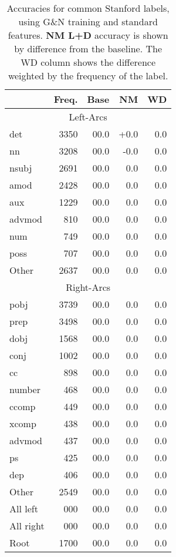 \documentclass[11pt,letterpaper]{article}
\begin{document}
\begin{table}
\centering
\small
\begin{tabular}{lrrrr}
        & Freq. & Base & NM & WD \\
    \hline \hline
    \multicolumn{5}{c}{Left-Arcs} \\
    \hline
    det	& 3350 & 00.0 & +0.0 & 0.0 \\
     nn	& 3208 & 00.0 &	-0.0 & 0.0 \\
  nsubj	& 2691 & 00.0 &	0.0 & 0.0 \\
   amod	& 2428 & 00.0 & 0.0 & 0.0 \\
aux	    & 1229 & 00.0 &	0.0 & 0.0 \\
advmod  & 810  & 00.0 & 0.0 & 0.0 \\
num	    & 749  & 00.0 & 0.0 & 0.0 \\
   poss	& 707  & 00.0 & 0.0 & 0.0 \\
  Other	& 2637 & 00.0 & 0.0 & 0.0 \\
\hline
\multicolumn{5}{c}{Right-Arcs} \\
\hline
pobj	& 3739  & 00.0 & 0.0 & 0.0 \\
prep	& 3498  & 00.0 & 0.0 & 0.0 \\
dobj	& 1568  & 00.0 & 0.0 & 0.0 \\
conj	& 1002  & 00.0 & 0.0 & 0.0 \\
cc	    & 898   & 00.0 & 0.0 & 0.0 \\
number	& 468   & 00.0 & 0.0 & 0.0 \\
 ccomp	& 449   & 00.0 & 0.0 & 0.0 \\
 xcomp	& 438   & 00.0 & 0.0 & 0.0 \\
advmod	& 437   & 00.0 & 0.0 & 0.0 \\
ps	    & 425   & 00.0 & 0.0 & 0.0 \\
dep	    & 406   & 00.0 & 0.0 & 0.0 \\
  Other	& 2549  & 00.0 & 0.0 & 0.0 \\
\hline
All left  & 000 & 00.0 & 0.0 & 0.0  \\
All right & 000 & 00.0 & 0.0 & 0.0  \\
Root    & 1700 & 00.0 & 0.0 & 0.0    \\     
\hline
\end{tabular}
\caption{\small Accuracies for common Stanford labels,
         using G\&N training and standard features.
         \textbf{NM L+D} accuracy is shown by difference from the baseline. The
         WD column shows the difference weighted by the frequency of the label.
     \label{tab:labels}}
\end{table}
\end{document}
